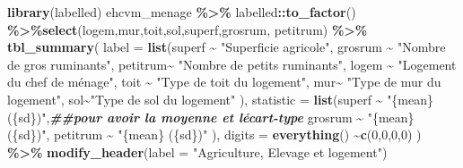 \documentclass[
]{article}
\newenvironment{Shaded}{\begin{snugshade}}{\end{snugshade}}
\newcommand{\AttributeTok}[1]{\textcolor[rgb]{0.13,0.29,0.53}{#1}}
\newcommand{\DecValTok}[1]{\textcolor[rgb]{0.00,0.00,0.81}{#1}}
\newcommand{\DocumentationTok}[1]{\textcolor[rgb]{0.56,0.35,0.01}{\textbf{\textit{#1}}}}
\newcommand{\FunctionTok}[1]{\textcolor[rgb]{0.13,0.29,0.53}{\textbf{#1}}}
\newcommand{\NormalTok}[1]{#1}
\newcommand{\SpecialCharTok}[1]{\textcolor[rgb]{0.81,0.36,0.00}{\textbf{#1}}}
\newcommand{\StringTok}[1]{\textcolor[rgb]{0.31,0.60,0.02}{#1}}
\begin{document}
\begin{Shaded}
\begin{Highlighting}[]
\FunctionTok{library}\NormalTok{(labelled)}
\NormalTok{ehcvm\_menage }\SpecialCharTok{\%\textgreater{}\%}\NormalTok{ labelled}\SpecialCharTok{::}\FunctionTok{to\_factor}\NormalTok{() }\SpecialCharTok{\%\textgreater{}\%}\FunctionTok{select}\NormalTok{(logem,mur,toit,sol,superf,grosrum, petitrum) }\SpecialCharTok{\%\textgreater{}\%} \FunctionTok{tbl\_summary}\NormalTok{( }\AttributeTok{label =} \FunctionTok{list}\NormalTok{(superf }\SpecialCharTok{\textasciitilde{}} \StringTok{"Superficie agricole"}\NormalTok{,}
\NormalTok{ grosrum }\SpecialCharTok{\textasciitilde{}} \StringTok{"Nombre de gros ruminants"}\NormalTok{,}
\NormalTok{ petitrum}\SpecialCharTok{\textasciitilde{}} \StringTok{"Nombre de petits ruminants"}\NormalTok{,}
\NormalTok{ logem }\SpecialCharTok{\textasciitilde{}} \StringTok{"Logement du chef de ménage"}\NormalTok{,}
\NormalTok{ toit }\SpecialCharTok{\textasciitilde{}} \StringTok{"Type de toit du logement"}\NormalTok{,}
\NormalTok{ mur}\SpecialCharTok{\textasciitilde{}} \StringTok{"Type de mur du logement"}\NormalTok{,}
\NormalTok{ sol}\SpecialCharTok{\textasciitilde{}}\StringTok{"Type de sol du logement"}
\NormalTok{ ),}
 \AttributeTok{statistic =} \FunctionTok{list}\NormalTok{(superf }\SpecialCharTok{\textasciitilde{}} \StringTok{"\{mean\} (\{sd\})"}\NormalTok{,}\DocumentationTok{\#\#pour avoir la moyenne et l\textquotesingle{}écart{-}type}
\NormalTok{                  grosrum }\SpecialCharTok{\textasciitilde{}} \StringTok{"\{mean\} (\{sd\})"}\NormalTok{,}
\NormalTok{                  petitrum }\SpecialCharTok{\textasciitilde{}} \StringTok{"\{mean\} (\{sd\})"}
\NormalTok{                  ),}
 \AttributeTok{digits =} \FunctionTok{everything}\NormalTok{() }\SpecialCharTok{\textasciitilde{}}\FunctionTok{c}\NormalTok{(}\DecValTok{0}\NormalTok{,}\DecValTok{0}\NormalTok{,}\DecValTok{0}\NormalTok{,}\DecValTok{0}\NormalTok{)}
\NormalTok{ ) }\SpecialCharTok{\%\textgreater{}\%} \FunctionTok{modify\_header}\NormalTok{(}\AttributeTok{label =} \StringTok{"Agriculture, Elevage et logement"}\NormalTok{)}
\end{Highlighting}
\end{Shaded}
\end{document}
